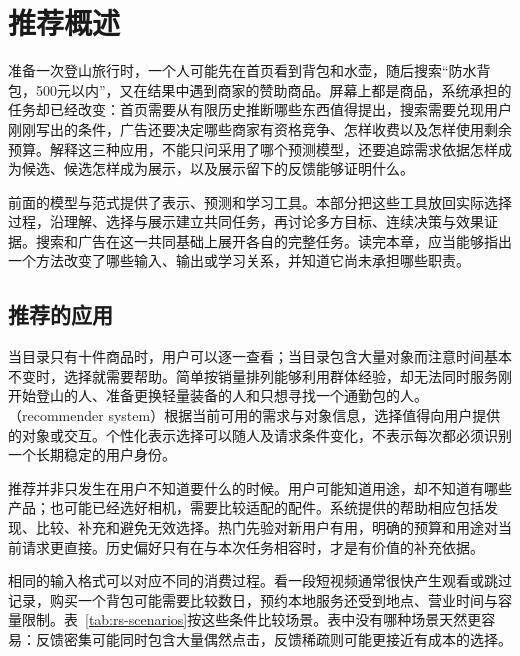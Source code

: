 \chapter{推荐概述}
\label{chap:rs-overview}

准备一次登山旅行时，一个人可能先在首页看到背包和水壶，随后搜索“防水背包，500元以内”，又在结果中遇到商家的赞助商品。屏幕上都是商品，系统承担的任务却已经改变：首页需要从有限历史推断哪些东西值得提出，搜索需要兑现用户刚刚写出的条件，广告还要决定哪些商家有资格竞争、怎样收费以及怎样使用剩余预算。解释这三种应用，不能只问采用了哪个预测模型，还要追踪需求依据怎样成为候选、候选怎样成为展示，以及展示留下的反馈能够证明什么。

前面的模型与范式提供了表示、预测和学习工具。本部分把这些工具放回实际选择过程，沿理解、选择与展示建立共同任务，再讨论多方目标、连续决策与效果证据。搜索和广告在这一共同基础上展开各自的完整任务。读完本章，应当能够指出一个方法改变了哪些输入、输出或学习关系，并知道它尚未承担哪些职责。

\section{推荐的应用}
\label{sec:rs-applications}

当目录只有十件商品时，用户可以逐一查看；当目录包含大量对象而注意时间基本不变时，选择就需要帮助。简单按销量排列能够利用群体经验，却无法同时服务刚开始登山的人、准备更换轻量装备的人和只想寻找一个通勤包的人。（recommender system）根据当前可用的需求与对象信息，选择值得向用户提供的对象或交互。个性化表示选择可以随人及请求条件变化，不表示每次都必须识别一个长期稳定的用户身份。

推荐并非只发生在用户不知道要什么的时候。用户可能知道用途，却不知道有哪些产品；也可能已经选好相机，需要比较适配的配件。系统提供的帮助相应包括发现、比较、补充和避免无效选择。热门先验对新用户有用，明确的预算和用途对当前请求更直接。历史偏好只有在与本次任务相容时，才是有价值的补充依据。

相同的输入格式可以对应不同的消费过程。看一段短视频通常很快产生观看或跳过记录，购买一个背包可能需要比较数日，预约本地服务还受到地点、营业时间与容量限制。表~\ref{tab:rs-scenarios}按这些条件比较场景。表中没有哪种场景天然更容易：反馈密集可能同时包含大量偶然点击，反馈稀疏则可能更接近有成本的选择。


